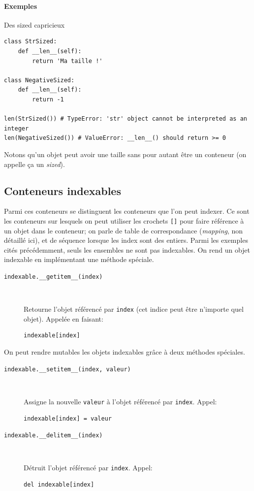 \documentclass[a4paper, 10pt]{article}
\begin{document}
\paragraph{Exemples} Des \og sized \fg{} capricieux
\begin{verbatim}
class StrSized:
    def __len__(self):
        return 'Ma taille !'

class NegativeSized:
    def __len__(self):
        return -1

len(StrSized()) # TypeError: 'str' object cannot be interpreted as an integer
len(NegativeSized()) # ValueError: __len__() should return >= 0
\end{verbatim}

Notons qu'un objet peut avoir une taille sans pour autant être un conteneur (on appelle ça un \emph{sized}).

\subsection{Conteneurs indexables}
Parmi ces conteneurs se distinguent les conteneurs que l'on peut indexer. Ce sont les conteneurs sur lesquels on peut utiliser les crochets \texttt{[]} pour faire référence à un objet dans le conteneur; on parle de table de correspondance (\emph{mapping}, non détaillé ici), et de séquence lorsque les index sont des entiers. Parmi les exemples cités précédemment, seuls les ensembles ne sont pas indexables. On rend un objet indexable en implémentant une méthode spéciale.

\begin{description}
    \item[\texttt{indexable.__getitem__(index)}]~

    Retourne l'objet référencé par \texttt{index} (cet indice peut être n'importe quel objet). Appelée en faisant:
    \begin{verbatim}
indexable[index]
    \end{verbatim}
\end{description}

On peut rendre mutables les objets indexables grâce à deux méthodes spéciales.

\begin{description}
    \item[\texttt{indexable.__setitem__(index, valeur)}]~

    Assigne la nouvelle \texttt{valeur} à l'objet référencé par \texttt{index}. Appel:
    \begin{verbatim}
indexable[index] = valeur
    \end{verbatim}

    \item[\texttt{indexable.__delitem__(index)}]~

    Détruit l'objet référencé par \texttt{index}. Appel:
    \begin{verbatim}
del indexable[index]
    \end{verbatim}
\end{description}
\end{document}
